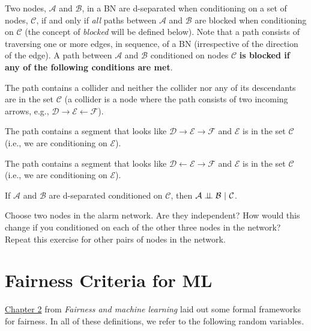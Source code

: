 \documentclass{tufte-handout}
\begin{document}
\begin{recall}
Two nodes, $\mathcal{A}$ and $\mathcal{B}$, in a BN are d-separated when conditioning on a set of nodes, $\mathcal{C}$, if and only if \emph{all} paths between  $\mathcal{A}$ and $\mathcal{B}$ are blocked when conditioning on $\mathcal{C}$ (the concept of \emph{blocked} will be defined below).  Note that a path consists of traversing one or more edges, in sequence, of a BN (irrespective of the direction of the edge).  A path between $\mathcal{A}$ and $\mathcal{B}$ conditioned on nodes $\mathcal{C}$ \textbf{is blocked if any of the following conditions are met}.
\be
\item The path contains a collider and neither the collider nor any of its descendants are in the set $\mathcal{C}$ (a collider is a node where the path consists of two incoming arrows, e.g., $\mathcal{D} \rightarrow \mathcal{E} \leftarrow \mathcal{F}$).
\item The path contains a segment that looks like $\mathcal{D} \rightarrow \mathcal{E} \rightarrow \mathcal{F}$ and $\mathcal{E}$ is in the set $\mathcal{C}$ (i.e., we are conditioning on $\mathcal{E}$).
\item The path contains a segment that looks like $\mathcal{D} \leftarrow \mathcal{E} \rightarrow \mathcal{F}$ and $\mathcal{E}$ is in the set $\mathcal{C}$ (i.e., we are conditioning on $\mathcal{E}$).
\ee


\vspace{1em}
\noindent If $\mathcal{A}$ and $\mathcal{B}$ are d-separated conditioned on $\mathcal{C}$, then $\mathcal{A} \perp\!\!\!\perp \mathcal{B}~|~\mathcal{C}$.

\end{recall}

\begin{exercise}
Choose two nodes in the alarm network.  Are they independent?  How would this change if you conditioned on each of the other three nodes in the network?  Repeat this exercise for other pairs of nodes in the network.
\end{exercise}

\section{Fairness Criteria for ML}

\href{https://fairmlbook.org/classification.html}{Chapter 2} from \emph{Fairness and machine learning} laid out some formal frameworks for fairness.  In all of these definitions, we refer to the following random variables.
\end{document}
